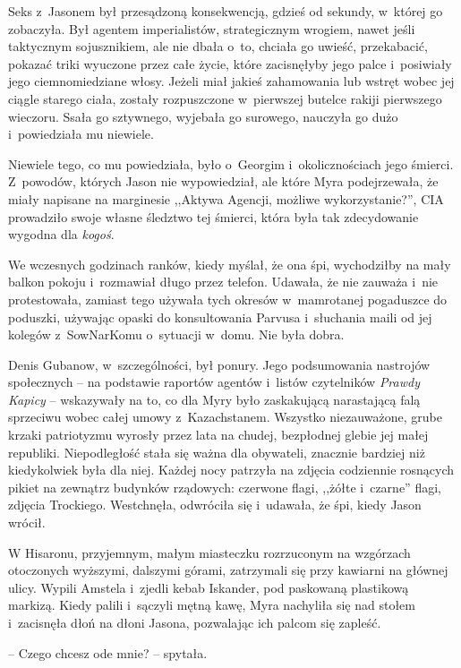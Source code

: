 \documentclass[oneside,polish,11pt,sfheadings]{mwbk}
\begin{document}
Seks z~Jasonem był przesądzoną konsekwencją, gdzieś od sekundy, w~której
go zobaczyła. Był agentem imperialistów, strategicznym wrogiem, nawet
jeśli taktycznym sojusznikiem, ale nie dbała o~to, chciała go uwieść,
przekabacić, pokazać triki wyuczone przez całe życie, które zacisnęłyby
jego palce i~posiwiały jego ciemnomiedziane włosy. Jeżeli miał jakieś
zahamowania lub wstręt wobec jej ciągle starego ciała, zostały
rozpuszczone w~pierwszej butelce rakiji pierwszego wieczoru. Ssała go
sztywnego, wyjebała go surowego, nauczyła go dużo i~powiedziała mu
niewiele.

Niewiele tego, co mu powiedziała, było o~Georgim i~okolicznościach jego
śmierci. Z~powodów, których Jason nie wypowiedział, ale które Myra
podejrzewała, że miały napisane na marginesie ,,Aktywa Agencji, możliwe
wykorzystanie?'', CIA prowadziło swoje własne śledztwo tej śmierci,
która była tak zdecydowanie wygodna dla \textit{kogoś}.

We wczesnych godzinach ranków, kiedy myślał, że ona śpi, wychodziłby na
mały balkon pokoju i~rozmawiał długo przez telefon. Udawała, że nie
zauważa i~nie protestowała, zamiast tego używała tych okresów w~mamrotanej pogaduszce do poduszki, używając opaski do konsultowania
Parvusa i~słuchania maili od jej kolegów z~SowNarKomu o~sytuacji w~domu.
Nie była dobra.

Denis Gubanow, w~szczególności, był ponury. Jego podsumowania nastrojów
społecznych -- na podstawie raportów agentów i~listów czytelników
\textit{Prawdy Kapicy} -- wskazywały na to, co dla Myry było zaskakującą
narastającą falą sprzeciwu wobec całej umowy z~Kazachstanem. Wszystko
niezauważone, grube krzaki patriotyzmu wyrosły przez lata na chudej,
bezpłodnej glebie jej małej republiki. Niepodległość stała się ważna dla
obywateli, znacznie bardziej niż kiedykolwiek była dla niej. Każdej nocy
patrzyła na zdjęcia codziennie rosnących pikiet na zewnątrz budynków
rządowych: czerwone flagi, ,,żółte i~czarne'' flagi, zdjęcia Trockiego.
Westchnęła, odwróciła się i~udawała, że śpi, kiedy Jason wrócił.

W Hisaronu, przyjemnym, małym miasteczku rozrzuconym na wzgórzach
otoczonych wyższymi, dalszymi górami, zatrzymali się przy kawiarni na
głównej ulicy. Wypili Amstela i~zjedli kebab Iskander, pod paskowaną
plastikową markizą. Kiedy palili i~sączyli mętną kawę, Myra nachyliła
się nad stołem i~zacisnęła dłoń na dłoni Jasona, pozwalając ich palcom
się zapleść.

-- Czego chcesz ode mnie? -- spytała.
\end{document}

